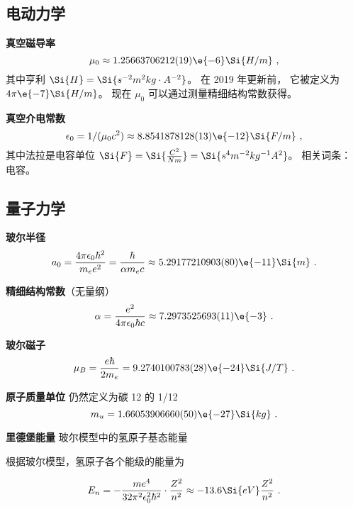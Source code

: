 \subsection{电动力学}

\textbf{真空磁导率}
\begin{equation}
\mu_0 \approx 1.25663706212(19)\e{-6} \Si{H/m}~,
\end{equation}
其中亨利 $\Si{H} = \Si{s^{-2}m^2 kg \cdot A^{-2}}$。 在 2019 年更新前， 它被定义为 $4\pi\e{-7} \Si{H/m}$。 现在 $\mu_0$ 可以通过测量精细结构常数获得。

\textbf{真空介电常数}
\begin{equation}
\epsilon_0 = 1/(\mu_0 c^2) \approx 8.8541878128(13)\e{-12} \Si{F/m}~,
\end{equation}
其中法拉是电容单位 $\Si{F} =\Si{\frac{C^2}{N m}} = \Si{s^4 m^{-2} kg^{-1} A^2}$。 相关词条： 电容。

\subsection{量子力学}
\textbf{玻尔半径}
\begin{equation}
a_0 = \frac{4\pi \epsilon_0 \hbar^2}{m_e e^2} = \frac{\hbar}{\alpha m_e c} \approx 5.29177210903(80)\e{-11}\Si{m}~.
\end{equation}

\textbf{精细结构常数}（无量纲）
\begin{equation}
\alpha = \frac{e^2}{4\pi\epsilon_0\hbar c} \approx 7.2973525693(11)\e{-3}~.
\end{equation}

\textbf{玻尔磁子}
\begin{equation}
\mu_B = \frac{e\hbar}{2m_e} = 9.2740100783(28)\e{-24} \Si{J/T}~.
\end{equation}

\textbf{原子质量单位}
仍然定义为碳 12 的 1/12
\begin{equation}
m_u = 1.66053906660(50)\e{-27} \Si{kg}~.
\end{equation}

\textbf{里德堡能量} 玻尔模型中的氢原子基态能量


根据玻尔模型，氢原子各个能级的能量为

\begin{equation}
E_n = - \frac{me^4}{32 \pi^2 \epsilon_0^2 \hbar^2} \cdot \frac{Z^2}{n^2} \approx -13.6 \Si{eV} \frac{Z^2}{n^2} ~.
\end{equation}

